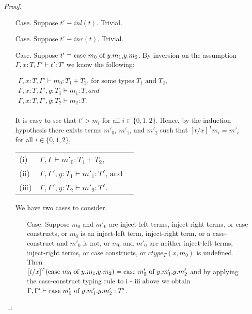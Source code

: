 \begin{proof}
\begin{itemize}
\item[Case.] Suppose $t' \equiv inl(t)$. Trivial.
  
\item[Case.] Suppose $t' \equiv inr(t)$. Trivial.
  
\item[Case.] Suppose $t' \equiv \mbox{case}\ m_0\ \text{of}\ y\text{.}m_1\text{,}y\text{.}m_2$. By inversion on the assumption
  $\Gamma,x:T,\Gamma' \vdash t':T'$ we know the following:
  \begin{center}
    \begin{math}
      \begin{array}{lll}
        \Gamma,x:T,\Gamma' \vdash m_0:T_1+T_2 \text{, for some types } T_1 \text{ and } T_2,\\
        \Gamma,x:T,\Gamma',y:T_1 \vdash m_1:T, and\\
        \Gamma,x:T,\Gamma',y:T_2 \vdash m_2:T.\\
      \end{array}
    \end{math}
  \end{center}
  It is easy to see that
  $t' > m_i$ for all $i \in \{0,1,2\}$.  Hence, by the induction hypothesis
  there exists terms $m'_0$, $m'_1$, and $m'_2$ such that $[t/x]^T m_i = m'_i$ for all $i \in \{0,1,2\}$,
  \begin{center}
    \begin{tabular}{lll}
      (i)   & $\Gamma,\Gamma \vdash m'_0:T_1+T_2$,  \\
      (ii)  & $\Gamma,\Gamma',y:T_1 \vdash m'_1:T'$, and\\
      (iii) & $\Gamma,\Gamma',y:T_2 \vdash m'_2:T'$.  
    \end{tabular}
  \end{center}
  We have two cases to consider.
  \begin{itemize}
  \item[Case.] Suppose $m_0$ and $m'_0$ are inject-left terms, inject-right terms, or case constructs,
    or $m_0$ is an inject-left term, inject-right term, or a case-construct and $m'_0$ is not, or
    $m_0$ and $m'_0$ are neither inject-left terms, inject-right terms, or case constructs, or
    $ctype_T(x,m_0)$ is undefined.
    Then \\
    $[t/x]^{T} (\mbox{case}\ m_0\ \text{of}\ y\text{.}m_1\text{,}y\text{.}m_2) = \mbox{case}\ m'_0\ \text{of}\ y\text{.}m'_1\text{,}y\text{.}m'_2$ and by applying the case-construct 
    typing rule to i - iii above we obtain \\ $\Gamma,\Gamma' \vdash \mbox{case}\ m'_0\ \text{of}\ y\text{.}m'_1\text{,}y\text{.}m'_2:T'$.
    

\end{itemize}
\end{itemize}
\end{proof}
